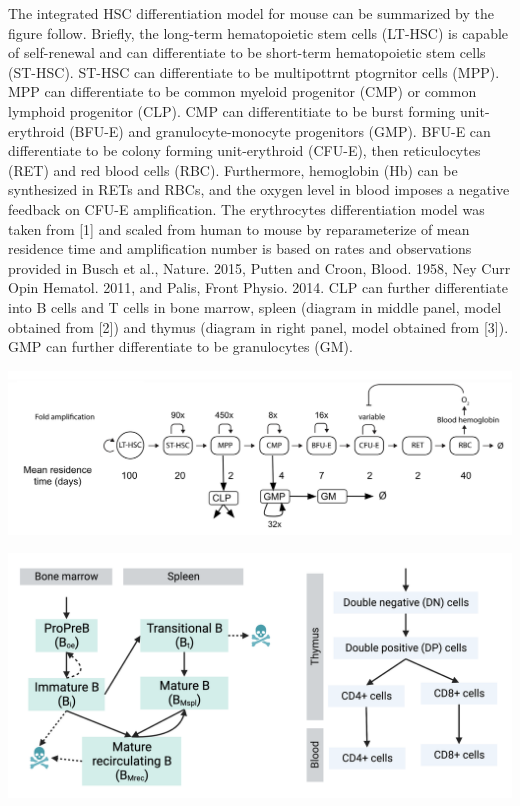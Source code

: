 \documentclass[a0paper,portrait]{baposter}
\begin{document}
\begin{poster}
{The integrated HSC differentiation model for mouse can be summarized by the figure follow. 
Briefly, the long-term hematopoietic stem cells (LT-HSC) is capable of self-renewal and can differentiate to be short-term hematopoietic stem cells (ST-HSC). 
ST-HSC can differentiate to be multipottrnt ptogrnitor cells (MPP). 
MPP can differentiate to be common myeloid progenitor (CMP) or common lymphoid progenitor (CLP). 
CMP can differentitiate to be burst forming unit-erythroid (BFU-E) and granulocyte-monocyte progenitors (GMP). 
BFU-E can differentiate to be colony forming unit-erythroid (CFU-E), then reticulocytes (RET) and red blood cells (RBC). Furthermore, hemoglobin (Hb) can be synthesized in RETs and RBCs, and the oxygen level in blood imposes a negative feedback on CFU-E amplification. 
The erythrocytes differentiation model was taken from [1]  and scaled from human to mouse by reparameterize of mean residence time and amplification number is based on rates and observations provided in Busch et al., Nature. 2015, Putten and Croon, Blood. 1958, Ney Curr Opin Hematol. 2011, and Palis, Front Physio. 2014.  
CLP can further differentiate into B cells and T cells in bone marrow, spleen (diagram in middle panel, model obtained from [2]) and thymus (diagram in right panel, model obtained from [3]). 
GMP can further differentiate to be granulocytes (GM). 


\begin{minipage}[b]{0.55\linewidth}
\centering
\includegraphics[width=\textwidth]{../img/mouse_full_model.png}
\end{minipage}
\hspace{0.5cm}
\begin{minipage}[b]{0.4\linewidth}
\centering
\includegraphics[width=\textwidth]{../img/Diagram_B_T.png}
\end{minipage}

}
\end{poster}
\end{document}
